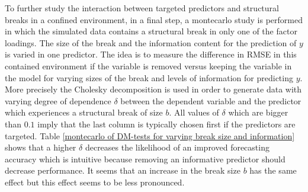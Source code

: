 \documentclass[12pt]{article}
\begin{document}
\clearpage

To further study the interaction between targeted predictors and structural breaks in a confined environment, in a final step, a montecarlo study is performed in which the simulated data contains a structural break in only one of the factor loadings. The size of the break and the information content for the prediction of $y$ is varied in one predictor. The idea is to measure the difference in RMSE in this contained environment if the variable is removed versus keeping the variable in the model for varying sizes of the break and levels of information for predicting $y$. More precisely the Cholesky decomposition is used in order to generate data with varying degree of dependence $\delta$ between the dependent variable and the predictor which experiences a structural break of size $b$. All values of $\delta$ which are bigger than $0.1$ imply that the last column is typically chosen first if the predictors are targeted.
Table \ref{montecarlo of DM-tests for varying break size and information} shows that a higher $\delta$ decreases the likelihood of an improved forecasting accuracy which is intuitive because removing an informative predictor should decrease performance. It seems that an increase in the break size $b$ has the same effect but this effect seems to be less pronounced.
\end{document}
